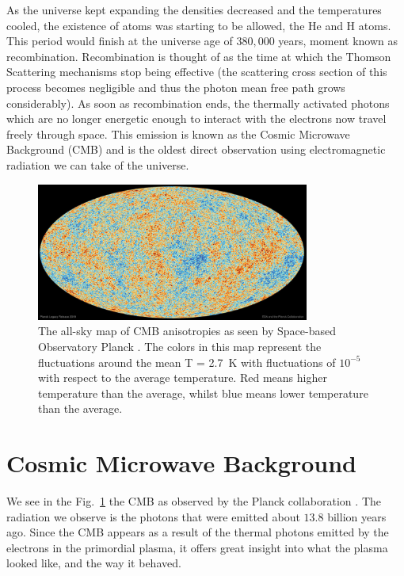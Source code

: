 As the universe kept expanding the densities decreased and the temperatures cooled, the existence of atoms was starting to be allowed, the He and H atoms. This period would finish at the universe age of $380,000$ years, moment known as recombination. Recombination is thought of as the time at which the Thomson Scattering mechanisms stop being effective (the scattering cross section of this process becomes negligible and thus the photon mean free path grows considerably).
As soon as recombination ends, the thermally activated photons which are no longer energetic enough to interact with the electrons now travel freely through space. This emission is known as the Cosmic Microwave Background (CMB) and is the oldest direct observation using electromagnetic radiation we can take of the universe. \\


\begin{figure}[t]
	\centering
	\includegraphics[width=0.8\textwidth]{../figs/cmb.jpeg}
	\caption[The all-sky map of CMB anisotropies as seen by the Planck Satellite.]{The all-sky map of CMB anisotropies as seen by Space-based Observatory Planck \cite{Planck2018}. The colors in this map represent the fluctuations around the mean T = \SI{2.7}{K} with fluctuations of $10^{-5}$ with respect to the average temperature. Red means higher temperature than the average, whilst blue means lower temperature than the average.}
	\label{fig:cmb}
\end{figure}
\section{Cosmic Microwave Background}

We see in the Fig.~\ref{fig:cmb} the CMB as observed by the Planck collaboration \cite{Planck2018}. The radiation we observe is the photons that were emitted about $13.8$ billion years ago. Since the CMB appears as a result of the thermal photons emitted by the electrons in the primordial plasma, it offers great insight into what the plasma looked like, and the way it behaved.  \\

